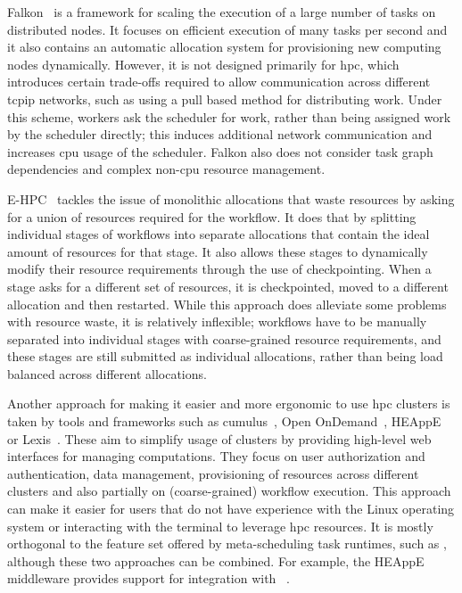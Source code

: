 Falkon~\cite{falkon} is a framework for scaling the execution of a large number of tasks
on distributed nodes. It focuses on efficient execution of many tasks per second and it also
contains an automatic allocation system for provisioning new computing nodes dynamically. However,
it is not designed primarily for \gls{hpc}, which introduces certain trade-offs
required to allow communication across different \gls{tcpip} networks, such as using a
pull based method for distributing work. Under this scheme, workers ask the scheduler for work,
rather than being assigned work by the scheduler directly; this induces additional network
communication and increases \gls{cpu} usage of the scheduler. Falkon also does not
consider task graph dependencies and complex non-\gls{cpu} resource management.

E-HPC~\cite{ehpc} tackles the issue of monolithic allocations that waste resources by
asking for a union of resources required for the workflow. It does that by splitting individual
stages of workflows into separate allocations that contain the ideal amount of resources for that
stage. It also allows these stages to dynamically modify their resource requirements through the
use of checkpointing. When a stage asks for a different set of resources, it is checkpointed, moved
to a different allocation and then restarted. While this approach does alleviate some problems with
resource waste, it is relatively inflexible; workflows have to be manually separated into
individual stages with coarse-grained resource requirements, and these stages are still submitted
as individual allocations, rather than being load balanced across different allocations.


Another approach for making it easier and more ergonomic to use \gls{hpc} clusters is
taken by tools and frameworks such as cumulus~\cite{cumulus}, Open
OnDemand~\cite{openondemand}, HEAppE~\cite{heappe} or Lexis~\cite{lexis}.
These aim to simplify usage of clusters by providing high-level web interfaces for managing
computations. They focus on user authorization and authentication, data management, provisioning of
resources across different clusters and also partially on (coarse-grained) workflow execution. This
approach can make it easier for users that do not have experience with the Linux operating system
or interacting with the terminal to leverage \gls{hpc} resources. It is mostly
orthogonal to the feature set offered by meta-scheduling task runtimes, such as
\hyperqueue{}, although these two approaches can be combined. For example, the HEAppE
middleware provides support for integration with \hyperqueue{}~\cite{heappe_hq}.

